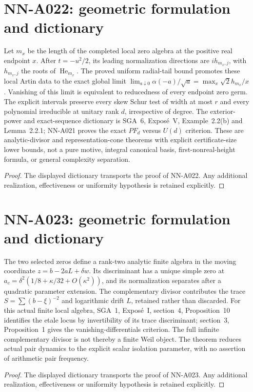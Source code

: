\section{NN-A022: geometric formulation and dictionary}
\begin{geometricstatement}[NN-A022]
Let $m_x$ be the length of the completed local zero algebra at the positive real endpoint $x$. After $t=-u^2/2$, its leading normalization directions are $i h_{m_x,j}$, with $h_{m_x,j}$ the roots of $\operatorname{He}_{m_x}$. The proved uniform radial-tail bound promotes these local Artin data to the exact global limit $\lim_{a\downarrow0}\alpha(-a)/\sqrt a=\max_x\sqrt2 h_{m_x}/x$. Vanishing of this limit is equivalent to reducedness of every endpoint zero germ. The explicit intervals preserve every skew Schur test of width at most $r$ and every polynomial irreducible at unitary rank $d$, irrespective of degree. The exterior-power and exact-sequence dictionary is SGA~6, Expos\'e~V, Example~2.2(b) and Lemma~2.2.1; NN-A021 proves the exact $PF_d$ versus $U(d)$ criterion. These are analytic-divisor and representation-cone theorems with explicit certificate-size lower bounds, not a pure motive, integral canonical basis, first-nonreal-height formula, or general complexity separation.
\end{geometricstatement}
\begin{proof} The displayed dictionary transports the proof of NN-A022. Any additional realization, effectiveness or uniformity hypothesis is retained explicitly.\end{proof}


\section{NN-A023: geometric formulation and dictionary}
\begin{geometricstatement}[NN-A023]
The two selected zeros define a rank-two analytic finite algebra in the moving coordinate $z=b-2aL+\delta w$. Its discriminant has a unique simple zero at $a_c=\delta^2(1/8+\kappa/32+O(\kappa^2))$, and its normalization separates after a quadratic parameter extension. The complementary divisor contributes the trace $S=\sum(b-\xi)^{-2}$ and logarithmic drift $L$, retained rather than discarded. For this actual finite local algebra, SGA~1, Expos\'e~I, section~4, Proposition~10 identifies the etale locus by invertibility of its trace discriminant; section~3, Proposition~1 gives the vanishing-differentials criterion. The full infinite complementary divisor is not thereby a finite Weil object. The theorem reduces actual pair dynamics to the explicit scalar isolation parameter, with no assertion of arithmetic pair frequency.
\end{geometricstatement}
\begin{proof} The displayed dictionary transports the proof of NN-A023. Any additional realization, effectiveness or uniformity hypothesis is retained explicitly.\end{proof}



